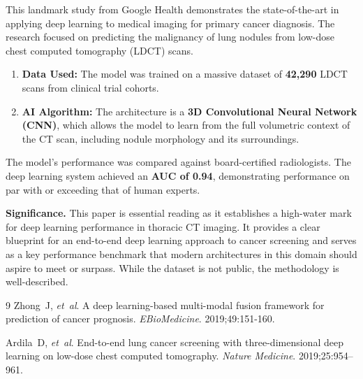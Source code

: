\documentclass[11pt,a4paper]{article}
\begin{document}
This landmark study from Google Health demonstrates the state-of-the-art in applying deep learning to medical imaging for primary cancer diagnosis.\cite{Ardila2019} The research focused on predicting the malignancy of lung nodules from low-dose chest computed tomography (LDCT) scans.

\begin{enumerate}[itemsep=2pt]
    \item \textbf{Data Used:} The model was trained on a massive dataset of \textbf{42,290} LDCT scans from clinical trial cohorts.
    \item \textbf{AI Algorithm:} The architecture is a \textbf{3D Convolutional Neural Network (CNN)}, which allows the model to learn from the full volumetric context of the CT scan, including nodule morphology and its surroundings.
\end{enumerate}

The model's performance was compared against board-certified radiologists. The deep learning system achieved an \textbf{AUC of 0.94}, demonstrating performance on par with or exceeding that of human experts.

\textbf{Significance.}
This paper is essential reading as it establishes a high-water mark for deep learning performance in thoracic CT imaging. It provides a clear blueprint for an end-to-end deep learning approach to cancer screening and serves as a key performance benchmark that modern architectures in this domain should aspire to meet or surpass. While the dataset is not public, the methodology is well-described.

\begin{thebibliography}{9}
Zhong~J, \textit{et~al}.
A deep learning-based multi-modal fusion framework for prediction of cancer prognosis.
\textit{EBioMedicine}. 2019;49:151-160.

Ardila~D, \textit{et~al}.
End-to-end lung cancer screening with three-dimensional deep learning on low-dose chest computed tomography.
\textit{Nature Medicine}. 2019;25:954–961.
\end{thebibliography}
\end{document}
